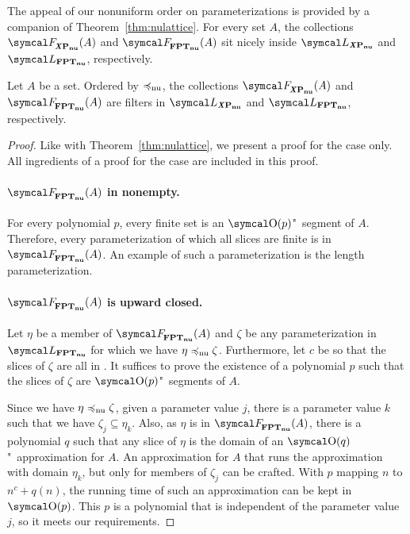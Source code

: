 The appeal of our nonuniform order on parameterizations is provided by a companion of Theorem~\ref{thm:nulattice}.
For every set $A$, the collections $\calF_\clXnu{P}(A)$ and $\calF_\clnu{FPT}(A)$ sit nicely \parencite{davey2002introduction} inside $\calL_\clXnu{P}$ and $\calL_\clnu{FPT}$, respectively.
\begin{theorem}
\label{thm:nufilter}%
  Let $A$ be a set.
  Ordered by $\preccurlyeq_\mathrm{nu}$, the collections $\calF_\clXnu{P}(A)$ and $\calF_\clnu{FPT}(A)$ are filters in $\calL_\clXnu{P}$ and $\calL_\clnu{FPT}$, respectively.
\end{theorem}
\begin{proof}
  Like with Theorem~\ref{thm:nulattice}, we present a proof for the  case only.
  All ingredients of a proof for the  case are included in this proof.

  \paragraph{$\calF_\clnu{FPT}(A)$ in nonempty.}
  For every polynomial $p$, every finite set is an $\bigO(p)$"~segment of $A$.
  Therefore, every parameterization of which all slices are finite is in $\calF_\clnu{FPT}(A)$.
  An example of such a parameterization is the length parameterization.

  \paragraph{$\calF_\clnu{FPT}(A)$ is upward closed.}
  Let $\eta$ be a member of $\calF_\clnu{FPT}(A)$ and $\zeta$ be any parameterization in $\calL_\clnu{FPT}$ for which we have $\eta \preccurlyeq_\mathrm{nu} \zeta$.
  Furthermore, let $c$ be so that the slices of $\zeta$ are all in .
  It suffices to prove the existence of a polynomial $p$ such that the slices of $\zeta$ are $\bigO(p)$"~segments of $A$.

  Since we have $\eta \preccurlyeq_\mathrm{nu} \zeta$, given a parameter value $j$, there is a parameter value $k$ such that we have $\zeta_j \subseteq \eta_k$.
  Also, as $\eta$ is in $\calF_\clnu{FPT}(A)$, there is a polynomial $q$ such that any slice of $\eta$ is the domain of an $\bigO(q)$"~approximation for $A$.
  An approximation for $A$ that runs the approximation with domain $\eta_k$, but only for members of $\zeta_j$ can be crafted.
  With $p$ mapping $n$ to $n^c + q(n)$, the running time of such an approximation can be kept in $\bigO(p)$.
  This $p$ is a polynomial that is independent of the parameter value $j$, so it meets our requirements.


\end{proof}
